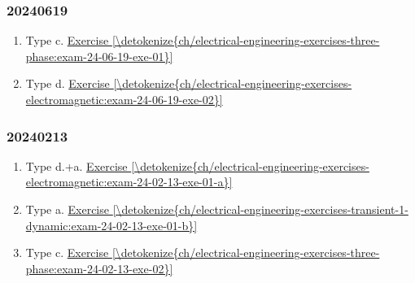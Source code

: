 \documentclass[letterpaper,10pt,italian]{jupyterBook}
\begin{document}
\subsubsection*{2024\sphinxhyphen{}06\sphinxhyphen{}19}
\begin{enumerate}
%
\item {} 
\sphinxAtStartPar
Type c. \hyperref[\detokenize{ch/electrical-engineering-exercises-three-phase:exam-24-06-19-exe-01}]{Exercise \ref{\detokenize{ch/electrical-engineering-exercises-three-phase:exam-24-06-19-exe-01}}}

\item {} 
\sphinxAtStartPar
Type d. \hyperref[\detokenize{ch/electrical-engineering-exercises-electromagnetic:exam-24-06-19-exe-02}]{Exercise \ref{\detokenize{ch/electrical-engineering-exercises-electromagnetic:exam-24-06-19-exe-02}}}

\end{enumerate}
\subsubsection*{2024\sphinxhyphen{}02\sphinxhyphen{}13}
\begin{enumerate}
%
\item {} 
\sphinxAtStartPar
Type d.+a. \hyperref[\detokenize{ch/electrical-engineering-exercises-electromagnetic:exam-24-02-13-exe-01-a}]{Exercise \ref{\detokenize{ch/electrical-engineering-exercises-electromagnetic:exam-24-02-13-exe-01-a}}}

\item {} 
\sphinxAtStartPar
Type a.    \hyperref[\detokenize{ch/electrical-engineering-exercises-transient-1-dynamic:exam-24-02-13-exe-01-b}]{Exercise \ref{\detokenize{ch/electrical-engineering-exercises-transient-1-dynamic:exam-24-02-13-exe-01-b}}}

\item {} 
\sphinxAtStartPar
Type c.    \hyperref[\detokenize{ch/electrical-engineering-exercises-three-phase:exam-24-02-13-exe-02}]{Exercise \ref{\detokenize{ch/electrical-engineering-exercises-three-phase:exam-24-02-13-exe-02}}}

\end{enumerate}

\sphinxstepscope
\end{document}

